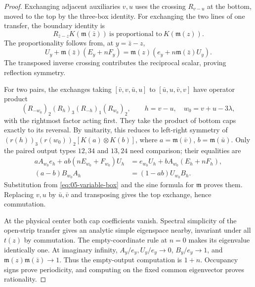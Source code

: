 \begin{proof}
Exchanging adjacent auxiliaries \(v,u\) uses the crossing \(R_{v-u}\) at the bottom, moved to the top by the three-box identity. For exchanging the two lines of one transfer, the boundary identity is
\[
 R_{\bar z-z}K(\mathfrak m(\bar z))
   \ \text{is proportional to}\ K(\mathfrak m(z)).
\]
The proportionality follows from, at \(y=\bar z-z\),
\[
 U_y+\mathfrak m(\bar z)(E_y+nF_y)
 =\mathfrak m(z)(e_y+n\mathfrak m(\bar z)U_y).
\]
The transposed inverse crossing contributes the reciprocal scalar, proving reflection symmetry.

For two pairs, the exchanges taking
\([\bar v,v,\bar u,u]\) to \([\bar u,u,\bar v,v]\) have operator product
\[
 (R_{-w_0})_2(R_h)_3(R_{-h})_1(R_{w_0})_2,
 \qquad h=v-u,\quad w_0=v+u-3\lambda,
\]
with the rightmost factor acting first. They take the product of bottom caps exactly to its reversal. By unitarity, this reduces to left-right symmetry of
\((r(h))_3(r(w_0))_2[K(a)\otimes K(b)]\),
where \(a=\mathfrak m(\bar v)\), \(b=\mathfrak m(\bar u)\). Only the paired output types \(12,34\) and \(13,24\) need comparison; their equalities are
\begin{equation}
 \begin{aligned}
 aA_{w_0}e_h+ab(nE_{w_0}+F_{w_0})U_h
   &=e_{w_0}U_h+bA_{w_0}(E_h+nF_h),\\
 (a-b)B_{w_0}A_h&=(1-ab)U_{w_0}B_h.
 \end{aligned}
 \label{eq:05-cap-exchange}
\end{equation}
Substitution from \eqref{eq:05-variable-box} and the sine formula for \(\mathfrak m\) proves them. Replacing \(v,u\) by \(\bar u,\bar v\) and transposing gives the top exchange, hence commutation.

At the physical center both cap coefficients vanish. Spectral simplicity of the open-strip transfer gives an analytic simple eigenspace nearby, invariant under all \(t(z)\) by commutation. The empty-coordinate rule at \(n=0\) makes its eigenvalue identically one. At imaginary infinity, \(A_y/e_y,U_y/e_y\to0\), \(B_y/e_y\to1\), and \(\mathfrak m(z)\mathfrak m(\bar z)\to1\). Thus the empty-output computation is \(1+n\). Occupancy signs prove periodicity, and computing on the fixed common eigenvector proves rationality.


\end{proof}
